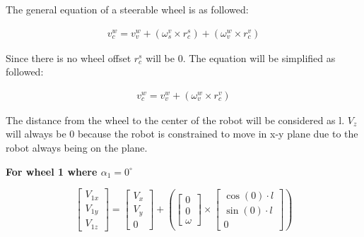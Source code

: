 \documentclass[answers]{exam}
\begin{document}
\begin{questions}
\begin{parts}
\begin{solution}
            The general equation of a steerable wheel is as followed:

            \begin{align*}
                v^w_c = v^w_v + ({\omega}^v_s \times r^s_c) + ({\omega}^w_v \times r^v_c)
            \end{align*}

            Since there is no wheel offset $r^s_c$ will be 0. The equation will be
            simplified as followed:

            \begin{align*}
                v^w_c = v^w_v + ({\omega}^w_v \times r^v_c)
            \end{align*}

            The distance from the wheel to the center of the robot will be considered as l.
            $V_z$ will always be 0 because the robot is constrained to move in x-y plane
            due to the robot always being on the plane.

            \textbf{For wheel 1 where $\alpha_1 = 0^\circ$}

            \begin{equation*}
                \begin{bmatrix}
                    V_{1x} \\
                    V_{1y} \\
                    V_{1z}
                \end{bmatrix}
                = \begin{bmatrix}
                    V_x \\
                    V_y \\
                    0
                \end{bmatrix}
                + \left(\begin{bmatrix}
                    0 \\
                    0 \\
                    \omega
                \end{bmatrix} \times \begin{bmatrix}
                    \cos(0) \cdot l \\
                    \sin(0) \cdot l \\
                    0
                \end{bmatrix}\right)
            \end{equation*}


\end{solution}
\end{parts}
\end{questions}
\end{document}
